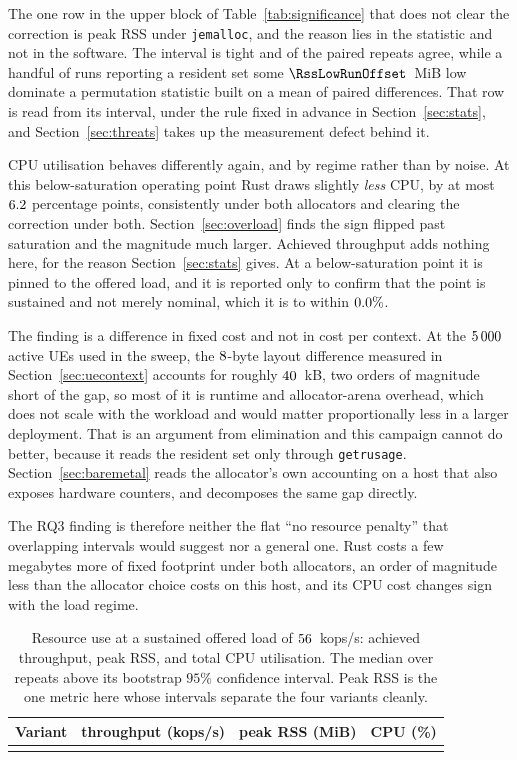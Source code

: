 \documentclass[english,oneside,a4paper,censored,csm,software-track-2020]{HYthesisML}
\begin{document}
The one row in the upper block of Table~\ref{tab:significance} that does not clear the correction
is peak RSS under \texttt{jemalloc}, and the reason lies in the statistic and not in the software.
The interval is tight and \RssAgree{} of the paired repeats agree, while a handful of runs reporting
a resident set some $\RssLowRunOffset$~MiB low dominate a permutation statistic built on a mean of
paired differences. That row is read from its interval, under the rule fixed in advance in
Section~\ref{sec:stats}, and Section~\ref{sec:threats} takes up the measurement defect behind it.

CPU utilisation behaves differently again, and by regime rather than by noise.
At this below-saturation operating point Rust draws slightly \emph{less} CPU, by
at most $6.2$ percentage points, consistently under both allocators and clearing the
correction under both. Section~\ref{sec:overload} finds the sign flipped past saturation and the
magnitude much larger. Achieved throughput adds nothing here, for the reason
Section~\ref{sec:stats} gives. At a below-saturation point it is pinned to the offered load, and
it is reported only to confirm that the point is sustained and not merely nominal, which it is to
within $0.0\%$.

The finding is a difference in fixed cost and not in cost per context. At the $5\,000$ active
UEs used in the sweep, the $8$-byte layout difference measured in
Section~\ref{sec:uecontext} accounts for roughly $40$~kB, two orders of magnitude
short of the gap, so most of it is runtime and allocator-arena overhead, which does not scale with
the workload and would matter proportionally less in a larger deployment. That is an argument from
elimination and this campaign cannot do better, because it reads the resident set only through
\texttt{getrusage}. Section~\ref{sec:baremetal} reads the allocator's own accounting on a host that
also exposes hardware counters, and decomposes the same gap directly.

The RQ3 finding is therefore neither the flat ``no resource penalty'' that overlapping intervals
would suggest nor a general one. Rust costs a few megabytes more of fixed footprint under both
allocators, an order of magnitude less than the allocator choice costs on this host, and its CPU
cost changes sign with the load regime.

\begin{table}[H]
\centering
\small
\caption[Resource use at the representative load]{Resource use at a sustained offered load of $56$~kops/s: achieved throughput,
peak RSS, and total CPU utilisation. The median over \NRepeats{} repeats above its bootstrap
$95\%$ confidence interval. Peak RSS is the one metric here whose intervals separate the four
variants cleanly.\label{tab:resource}}
\begin{tabular}{@{}l r r r@{}}
\hline\hline
Variant & throughput (kops/s) & peak RSS (MiB) & CPU (\%) \\
\hline
\\
\hline
\end{tabular}
\end{table}
\end{document}
